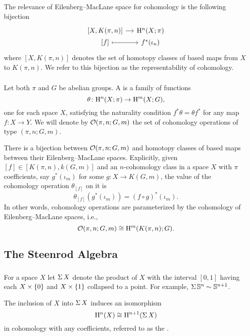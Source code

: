 The relevance of Eilenberg--MacLane space for cohomology is the following bijection
\[
\begin{tikzcd}[column sep=small, row sep=0]
	{[X, K(\pi, n)]} \rar & \rH^n(X; \pi) \\
	{[f]} \rar[maps to] & f^*(\iota_n)
\end{tikzcd}
\]
where $[X, K(\pi, n)]$ denotes the set of homotopy classes of based maps from $X$ to $K(\pi, n)$.
We refer to this bijection as the representability of cohomology.

\subsubsection{} Let both $\pi$ and $G$ be abelian groups.
A  is a family of functions
\[
\theta \colon \mathrm{H}^n(X; \pi) \rightarrow \mathrm{H}^m(X; G),
\]
one for each space $X$, satisfying the naturality condition $f^* \theta = \theta f^*$ for any map $f \colon X \rightarrow Y$.
We will denote by $\mathcal{O}(\pi, n; G,m)$ the set of cohomology operations of type $(\pi, n; G,m)$.

There is a bijection between $\mathcal{O}(\pi, n; G,m)$ and homotopy classes of based maps between their Eilenberg--MacLane spaces.
Explicitly, given $[f] \in [K(\pi,n), k(G,m)]$ and an $n$-cohomology class in a space $X$ with $\pi$ coefficients, say $g^*(\iota_m)$ for some $g \colon X \to K(G, m)$, the value of the cohomology operation $\theta_{[f]}$ on it is
\[
\theta_{[f]}(g^*(\iota_m)) = (f \circ g)^*(\iota_m).
\]
In other words, cohomology operations are parameterized by the cohomology of Eilenberg--MacLane spaces, i.e.,
\[
\mathcal{O}(\pi, n; G,m) \cong \mathrm{H}^m(K(\pi,n); G).
\]

\subsection{The Steenrod Algebra}\label{ss:steenrod}

\subsubsection{} For a space $X$ let $\operatorname{\Sigma} X$ denote the product of $X$ with the interval $[0,1]$ having each $X \times \{0\}$ and $X \times \{1\}$ collapsed to a point.
For example, $\operatorname{\Sigma} \mathbb{S}^n \sim \mathbb{S}^{n+1}$.

The inclusion of $X$ into $\operatorname{\Sigma} X$ induces an isomorphism
\[
\mathrm{H}^n(X) \cong \mathrm{H}^{n+1}(\operatorname{\Sigma} X)
\]
in cohomology with any coefficients, referred to as the .

